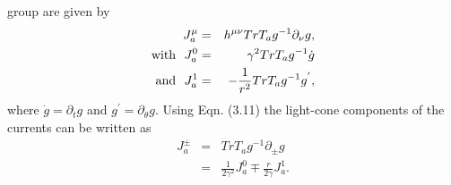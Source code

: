 \documentclass[a4paper,12pt]{article}
\begin{document}
group are given by 
\begin{eqnarray}
J^{\mu}_a&=&h^{{\mu}{\nu}} Tr T_ag^{-1}{\partial}_{\nu}g,\nonumber\\
{\rm with}~~
J^{0}_a&=&{\gamma}^2TrT_a g^{-1}\dot{g}\nonumber\\
{\rm and}~~
J^{1}_a&=&-\frac{1}{r^2}TrT_a g^{-1} g^{'},\nonumber\\
\end{eqnarray}
where $ \dot{g}={\partial}_{t}g $ and $ g^{'}={\partial}_{\theta}g $.
Using Eqn. (3.11) the light-cone components of the currents can be written
as 
\begin{eqnarray}
J^{\pm}_{a}&=&Tr T_a g^{-1}{\partial}_{\pm}g\nonumber\\
&=&\frac{1}{2{\gamma}^2}J^{0}_a {\mp}\frac{r}{2{\gamma}}J^{1}_a. 
\end{eqnarray}
\end{document}
